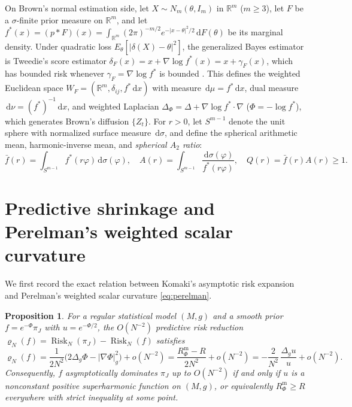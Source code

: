 \documentclass[a4paper,11pt,noarxiv]{quantumarticle}
\newcommand{\R}{\mathbb{R}}
\newcommand{\Rm}{R^{\mathrm m}}
\newcommand{\Risk}{\operatorname{Risk}}
\newcommand{\abs}[1]{\lvert #1\rvert}
\newcommand{\dd}{\,\mathrm{d}}
\newcommand{\grad}{\nabla}
\newcommand{\fbar}{\bar f}
\theoremstyle{plain}
\newtheorem{proposition}[theorem]{Proposition}
\theoremstyle{definition}
\theoremstyle{remark}
\begin{document}
On Brown's normal estimation side, let $X\sim N_m(\theta,I_m)$ in
$\R^m$ ($m\ge3$), let $F$ be a $\sigma$-finite prior measure on $\R^m$,
and let $f^*(x)=(p*F)(x)=\int_{\R^m}(2\pi)^{-m/2}e^{-\abs{x-\theta}^2/2}\dd F(\theta)$
be its marginal density. Under quadratic loss
$E_\theta[\abs{\delta(X)-\theta}^2]$, the generalized Bayes estimator is
Tweedie's score estimator
$\delta_F(x)=x+\grad\log f^*(x)=x+\gamma_F(x)$, which has bounded risk
whenever $\gamma_F=\grad\log f^*$ is bounded \cite[\S3]{brown1971}.
This defines the weighted Euclidean space
$W_F=(\R^m,\delta_{ij},f^*\dd x)$ with measure $\dd\mu=f^*\dd x$, dual
measure $\dd\nu=(f^*)^{-1}\dd x$, and weighted Laplacian
$\Delta_\Phi=\Delta+\grad\log f^*\cdot\grad$ ($\Phi=-\log f^*$), which
generates Brown's diffusion $\{Z_t\}$. For $r>0$, let $S^{m-1}$ denote
the unit sphere with normalized surface measure $\dd\sigma$, and define
the spherical arithmetic mean, harmonic-inverse mean, and
\emph{spherical $A_2$ ratio}:
\begin{equation}\label{eq:spherical_a2}
\fbar(r)=\int_{S^{m-1}}f^*(r\varphi)\dd\sigma(\varphi),\quad
A(r)=\int_{S^{m-1}}\frac{\dd\sigma(\varphi)}{f^*(r\varphi)},\quad
Q(r)=\fbar(r)A(r)\ge1.
\end{equation}

\section{Predictive shrinkage and Perelman's weighted scalar curvature}
\label{sec:komaki}

We first record the exact relation between Komaki's asymptotic risk
expansion \cite{komaki2006,komaki2015} and Perelman's weighted scalar
curvature \eqref{eq:perelman}.

\begin{proposition}\label{prop:komaki_perelman}
For a regular statistical model $(M,g)$ and a smooth prior
$f=e^{-\Phi}\pi_J$ with $u=e^{-\Phi/2}$, the $O(N^{-2})$ predictive risk
reduction $\varrho_N(f)=\Risk_N(\pi_J)-\Risk_N(f)$ satisfies
\begin{equation}\label{eq:komaki_perelman}
\varrho_N(f)
=\frac{1}{2N^2}\bigl(2\Delta_g\Phi-\abs{\grad\Phi}_g^2\bigr)+o(N^{-2})
=\frac{\Rm_\Phi-R}{2N^2}+o(N^{-2})
=-\frac{2}{N^2}\,\frac{\Delta_g u}{u}+o(N^{-2}).
\end{equation}
Consequently, $f$ asymptotically dominates $\pi_J$ up to $O(N^{-2})$ if
and only if $u$ is a nonconstant positive superharmonic function on
$(M,g)$, or equivalently $\Rm_\Phi\ge R$ everywhere with strict
inequality at some point.
\end{proposition}
\end{document}

